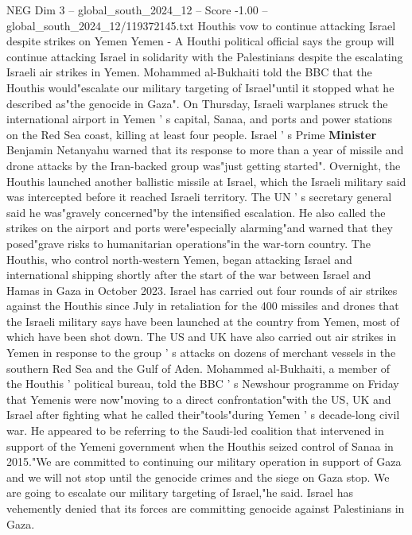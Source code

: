 \begin{textsample}{NEG Dim 3 – global\_south\_2024\_12 – Score -1.00 – global\_south\_2024\_12/119372145.txt}  \label{ex:f3_neg_064}
Houthis vow to continue attacking Israel despite strikes on Yemen Yemen - A Houthi political official says the group will continue attacking Israel in solidarity with the Palestinians despite the escalating Israeli air strikes in Yemen.
Mohammed al-Bukhaiti told the BBC that the Houthis would"escalate our military targeting of Israel"until it stopped what he described as"the genocide in Gaza".
On Thursday, Israeli warplanes struck the international airport in Yemen ' s capital, Sanaa, and ports and power stations on the Red Sea coast, killing at least four people.
Israel ' s Prime \textbf{Minister} Benjamin Netanyahu warned that its response to more than a year of missile and drone attacks by the Iran-backed group was"just getting started".
Overnight, the Houthis launched another ballistic missile at Israel, which the Israeli military said was intercepted before it reached Israeli territory.
The UN ' s secretary general said he was"gravely concerned"by the intensified escalation.
He also called the strikes on the airport and ports were"especially alarming"and warned that they posed"grave risks to humanitarian operations"in the war-torn country.
The Houthis, who control north-western Yemen, began attacking Israel and international shipping shortly after the start of the war between Israel and Hamas in Gaza in October 2023.
Israel has carried out four rounds of air strikes against the Houthis since July in retaliation for the 400 missiles and drones that the Israeli military says have been launched at the country from Yemen, most of which have been shot down.
The US and UK have also carried out air strikes in Yemen in response to the group ' s attacks on dozens of merchant vessels in the southern Red Sea and the Gulf of Aden.
Mohammed al-Bukhaiti, a member of the Houthis ' political bureau, told the BBC ' s Newshour programme on Friday that Yemenis were now"moving to a direct confrontation"with the US, UK and Israel after fighting what he called their"tools"during Yemen ' s decade-long civil war.
He appeared to be referring to the Saudi-led coalition that intervened in support of the Yemeni government when the Houthis seized control of Sanaa in 2015."We are committed to continuing our military operation in support of Gaza and we will not stop until the genocide crimes and the siege on Gaza stop.
We are going to escalate our military targeting of Israel,"he said.
Israel has vehemently denied that its forces are committing genocide against Palestinians in Gaza.

\end{textsample}
